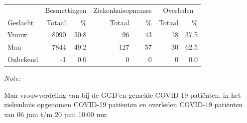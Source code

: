 \documentclass[
  english,
  man,floatsintext]{apa6}
\begin{document}
\begin{table}
\centering\begingroup\fontsize{11}{13}\selectfont

\begin{threeparttable}
\begin{tabular}{lrrrrrr}
\toprule
\multicolumn{1}{c}{ } & \multicolumn{2}{c}{Besmettingen} & \multicolumn{2}{c}{Ziekenhuisopnames} & \multicolumn{2}{c}{Overleden} \\
\cmidrule(l{3pt}r{3pt}){2-3} \cmidrule(l{3pt}r{3pt}){4-5} \cmidrule(l{3pt}r{3pt}){6-7}
Geslacht & Totaal & \% & Totaal & \% & Totaal & \%\\
\midrule
Vrouw & 8090 & 50.8 & 96 & 43 & 18 & 37.5\\
Man & 7844 & 49.2 & 127 & 57 & 30 & 62.5\\
Onbekend & -1 & 0.0 & 0 & 0 & 0 & 0.0\\
\bottomrule
\end{tabular}
\begin{tablenotes}
\item \textit{Note: } 
\item Man-vrouwverdeling van bij de GGD’en gemelde COVID-19 patiënten, in het ziekenhuis opgenomen COVID-19 patiënten en overleden COVID-19 patiënten van 06 juni t/m 20 juni 10:00 uur.
\end{tablenotes}
\end{threeparttable}
\endgroup{}
\end{table}
\newpage
\end{document}

